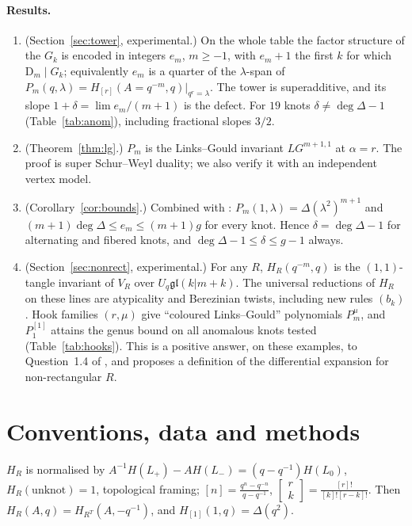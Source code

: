 \documentclass[11pt]{article}
\theoremstyle{definition}
\theoremstyle{remark}
\newcommand{\D}{\mathrm{D}}
\newcommand{\qbin}[2]{\left[\begin{smallmatrix}#1\\#2\end{smallmatrix}\right]}
\newcommand{\gl}{\mathfrak{gl}}
\begin{document}
\paragraph{Results.}
\begin{enumerate}
\item (Section~\ref{sec:tower}, experimental.) On the whole table the factor structure of the $G_k$ is encoded in
integers $e_m$, $m\ge-1$, with $e_m+1$ the first $k$ for which $\D_m\mid G_k$; equivalently $e_m$ is a quarter of
the $\lambda$-span of $P_m(q,\lambda)=H_{[r]}(A=q^{-m},q)|_{q^r=\lambda}$.  The tower is superadditive, and its
slope $1+\delta=\lim e_m/(m+1)$ is the defect.  For $19$ knots $\delta\neq\deg\Delta-1$ (Table~\ref{tab:anom}),
including fractional slopes $3/2$.
\item (Theorem~\ref{thm:lg}.) $P_m$ is the Links--Gould invariant $LG^{m+1,1}$ at $\alpha=r$.  The proof is
super Schur--Weyl duality; we also verify it with an independent vertex model.
\item (Corollary~\ref{cor:bounds}.) Combined with \cite{KT,LNG}: $P_m(1,\lambda)=\Delta(\lambda^2)^{m+1}$ and
$(m+1)\deg\Delta\le e_m\le(m+1)g$ for every knot.  Hence $\delta=\deg\Delta-1$ for alternating and fibered knots, and
$\deg\Delta-1\le\delta\le g-1$ always.
\item (Section~\ref{sec:nonrect}, experimental.) For any $R$, $H_R(q^{-m},q)$ is the $(1,1)$-tangle invariant of
$V_R$ over $U_q\gl(k|m+k)$.  The universal reductions of $H_R$ on these lines are atypicality and
Berezinian twists, including new rules $(b_k)$.  Hook families $(r,\mu)$ give ``coloured Links--Gould''
polynomials $P^\mu_m$, and $P^{[1]}_1$ attains the genus bound on all anomalous knots tested
(Table~\ref{tab:hooks}).  This is a positive answer, on these examples, to Question~1.4 of \cite{LNG}, and proposes
a definition of the differential expansion for non-rectangular $R$.
\end{enumerate}

\section{Conventions, data and methods}\label{sec:data}

$H_R$ is normalised by $A^{-1}H(L_+)-AH(L_-)=(q-q^{-1})H(L_0)$, $H_R(\text{unknot})=1$, topological framing;
$[n]=\frac{q^n-q^{-n}}{q-q^{-1}}$, $\qbin rk=\frac{[r]!}{[k]![r-k]!}$.  Then
$H_R(A,q)=H_{R^T}(A,-q^{-1})$, and $H_{[1]}(1,q)=\Delta(q^2)$.
\end{document}
